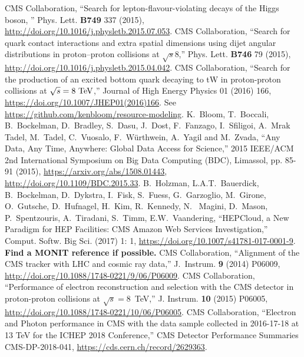 \begin{thebibliography}{99}
%
 CMS Collaboration, ``Search for lepton-flavour-violating decays of the Higgs boson, '' Phys. Lett. {\bf B749} 337 (2015), \url{http://doi.org/10.1016/j.physletb.2015.07.053}.
%
CMS Collaboration, ``Search for quark contact interactions and extra spatial dimensions using dijet angular distributions in proton–proton collisions at $\sqrt{s}$8\TeV,'' Phys. Lett. {\bf B746} 79 (2015), \url{http://doi.org/10.1016/j.physletb.2015.04.042}.
%
CMS Collaboration, ``Search for the production of an excited bottom quark decaying to tW in proton-proton collisions at $\sqrt{s} = 8\TeV$,'' Journal of High Energy Physics 01 (2016) 166,  \url{https://doi.org/10.1007/JHEP01(2016)166}.
%
%
  See
  \url{https://github.com/kenbloom/resource-modeling}.
 K.~Bloom, T.~Boccali, B.~Bockelman, D.~Bradley, S.~Dasu,
  J.~Dost, F.~Fanzago, I.~Sfiligoi, A.~Mrak Tadel, M.~Tadel, C.~Vuosalo,
  F.~W{\"u}rthwein, A.~Yagil and M.~Zvada, ``Any Data, Any Time, Anywhere:
  Global Data Access for Science,'' 2015 IEEE/ACM 2nd International
  Symposium on Big Data Computing (BDC), Limassol, pp. 85-91 (2015),
  \url{https://arxiv.org/abs/1508.01443}, \url{http://doi.org/10.1109/BDC.2015.33}.
%
 B.~Holzman, L.A.T.~Bauerdick, B.~Bockelman, D.~Dykstra, I.~Fisk, S.~Fuess, G.~Garzoglio, M.~Girone, O.~Gutsche, D.~Hufnagel, H.~Kim, R.~Kennedy, N.~ Magini, D.~Mason, P.~Spentzouris, A.~Tiradani, S.~Timm, E.W.~Vaandering, ``HEPCloud, a New Paradigm for HEP Facilities: CMS Amazon Web Services Investigation,''
Comput. Softw. Big Sci. (2017) 1: 1, \url{https://doi.org/10.1007/s41781-017-0001-9}.
%
 {\bf Find a MONIT reference if possible.}
%
%
CMS Collaboration, ``Alignment of the CMS tracker with LHC and cosmic ray data,'' J.~Instrum. \textbf{9} (2014) P06009, 
\url{http://doi.org/10.1088/1748-0221/9/06/P06009}.
%
CMS Collaboration, ``Performance of electron reconstruction and selection with the CMS detector in proton-proton collisions at $\sqrt{s}=$8~TeV,'' J. Instrum. {\bf 10} (2015) P06005, \url{http://doi.org/10.1088/1748-0221/10/06/P06005}.
%
    CMS Collaboration, ``Electron and Photon performance in CMS with the data sample collected in 2016-17-18 at 13 TeV for the ICHEP 2018 Conference,''
    CMS Detector Performance Summaries CMS-DP-2018-041, \url{https://cds.cern.ch/record/2629363}.

\end{thebibliography}
